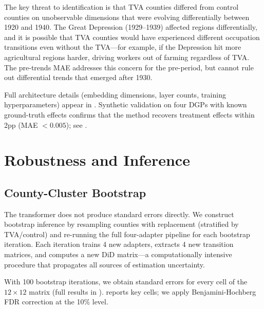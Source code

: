 \documentclass[12pt]{article}
\begin{document}
The key threat to identification is that TVA counties differed from control counties on unobservable dimensions that were evolving differentially between 1920 and 1940. The Great Depression (1929--1939) affected regions differentially, and it is possible that TVA counties would have experienced different occupation transitions even without the TVA---for example, if the Depression hit more agricultural regions harder, driving workers out of farming regardless of TVA. The pre-trends MAE addresses this concern for the pre-period, but cannot rule out differential trends that emerged after 1930.

Full architecture details (embedding dimensions, layer counts, training hyperparameters) appear in . Synthetic validation on four DGPs with known ground-truth effects confirms that the method recovers treatment effects within 2pp (MAE $< 0.005$); see .


\section{Robustness and Inference}
\label{sec:robustness}

\subsection{County-Cluster Bootstrap}

The transformer does not produce standard errors directly. We construct bootstrap inference by resampling counties with replacement (stratified by TVA/control) and re-running the full four-adapter pipeline for each bootstrap iteration. Each iteration trains 4 new adapters, extracts 4 new transition matrices, and computes a new DiD matrix---a computationally intensive procedure that propagates all sources of estimation uncertainty.

With 100 bootstrap iterations, we obtain standard errors for every cell of the $12 \times 12$ matrix (full results in ).  reports key cells; we apply Benjamini-Hochberg FDR correction \citep{benjamini1995} at the 10\% level.
\end{document}
